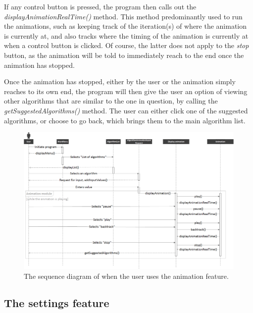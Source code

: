 If any control button is pressed, the program then calls out the \textit{displayAnimationRealTime()} method. This method predominantly used to run the animations, such as keeping track of the iteration(s) of where the animation is currently at, and also tracks where the timing of the animation is currently at when a control button is clicked. Of course, the latter does not apply to the \textit{stop} button, as the animation will be told to immediately reach to the end once the animation has stopped. 

Once the animation has stopped, either by the user or the animation simply reaches to its own end, the program will then give the user an option of viewing other algorithms that are similar to the one in question, by calling the \textit{getSuggestedAlgorithms()} method. The user can either click one of the suggested algorithms, or choose to go back, which brings them to the main algorithm list.

\begin{landscape}
\begin{figure}[H]
\centering
\includegraphics[scale=0.55]{images/report_images/sequenceDiagramShowAlgorithmList.png}
\caption{The sequence diagram of when the user uses the animation feature.}
\label{sequenceDiagramShowAlgorithmList}
\end{figure}
\end{landscape}

\newpage

\subsection{The settings feature}

